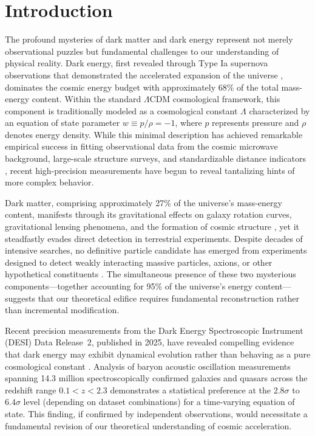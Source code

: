 \section{Introduction}
\label{sec:intro}

The profound mysteries of dark matter and dark energy represent not merely observational puzzles but fundamental challenges to our understanding of physical reality. Dark energy, first revealed through Type Ia supernova observations that demonstrated the accelerated expansion of the universe \citep{Riess1998,Perlmutter1999}, dominates the cosmic energy budget with approximately 68\% of the total mass-energy content. Within the standard $\Lambda$CDM cosmological framework, this component is traditionally modeled as a cosmological constant $\Lambda$ characterized by an equation of state parameter $w \equiv p/\rho = -1$, where $p$ represents pressure and $\rho$ denotes energy density. While this minimal description has achieved remarkable empirical success in fitting observational data from the cosmic microwave background, large-scale structure surveys, and standardizable distance indicators \citep{Planck2020}, recent high-precision measurements have begun to reveal tantalizing hints of more complex behavior.

Dark matter, comprising approximately 27\% of the universe's mass-energy content, manifests through its gravitational effects on galaxy rotation curves, gravitational lensing phenomena, and the formation of cosmic structure \citep{Clowe2006}, yet it steadfastly evades direct detection in terrestrial experiments. Despite decades of intensive searches, no definitive particle candidate has emerged from experiments designed to detect weakly interacting massive particles, axions, or other hypothetical constituents \citep{Aprile2018}. The simultaneous presence of these two mysterious components—together accounting for 95\% of the universe's energy content—suggests that our theoretical edifice requires fundamental reconstruction rather than incremental modification.

Recent precision measurements from the Dark Energy Spectroscopic Instrument (DESI) Data Release~2, published in 2025, have revealed compelling evidence that dark energy may exhibit dynamical evolution rather than behaving as a pure cosmological constant \citep{DESI2025}. Analysis of baryon acoustic oscillation measurements spanning 14.3 million spectroscopically confirmed galaxies and quasars across the redshift range $0.1 < z < 2.3$ demonstrates a statistical preference at the $2.8\sigma$ to $6.4\sigma$ level (depending on dataset combinations) for a time-varying equation of state. This finding, if confirmed by independent observations, would necessitate a fundamental revision of our theoretical understanding of cosmic acceleration.

